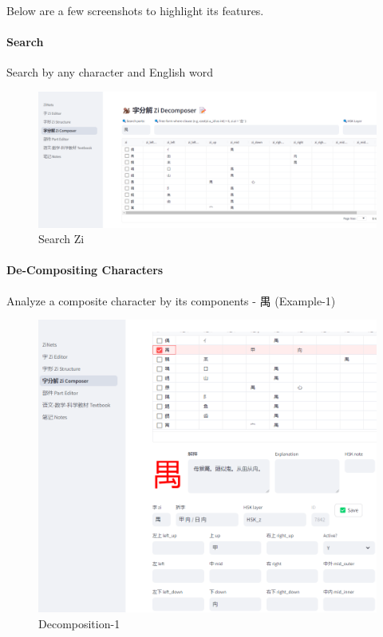 \documentclass[
  11pt,
  letterpaper,
]{article}
\begin{document}
Below are a few screenshots to highlight its features.

\paragraph{Search}\label{search}

Search by any character and English word

\begin{figure}
\centering
\includegraphics{./images/app_discover-zi-by-part.png}
\caption{Search Zi}
\end{figure}

\paragraph{De-Compositing Characters}\label{de-compositing-characters}

Analyze a composite character by its components - 禺 (Example-1)

\begin{figure}
\centering
\includegraphics{./images/app_zi-parts_1.png}
\caption{Decomposition-1}
\end{figure}
\end{document}
